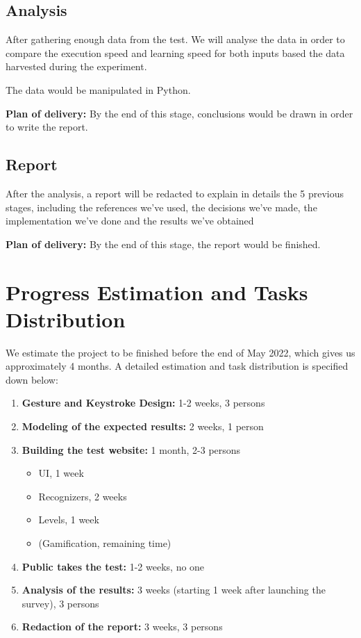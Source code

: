 \documentclass[12pt]{article}
\begin{document}
\subsection{Analysis}
After gathering enough data from the test. We will analyse the data in order to compare the execution speed and learning speed for both inputs based the data harvested during the experiment.

The data would be manipulated in Python.

\textbf{Plan of delivery: }By the end of this stage, conclusions would be drawn in order to write the report.

\subsection{Report}
After the analysis, a report will be redacted to explain in details the 5 previous stages, including the references we've used, the decisions we've made, the implementation we've done and the results we've obtained

\textbf{Plan of delivery: }By the end of this stage, the report would be finished.

\section{Progress Estimation and Tasks Distribution}
We estimate the project to be finished before the end of May 2022, which gives us approximately 4 months. A detailed estimation and task distribution is specified down below:

\begin{enumerate}
    \item \textbf{Gesture and Keystroke Design:} 1-2 weeks, 3 persons
    \item \textbf{Modeling of the expected results:} 2 weeks, 1 person
    \item \textbf{Building the test website:} 1 month, 2-3 persons
    \begin{itemize}
        \item UI, 1 week
        \item Recognizers, 2 weeks
        \item Levels, 1 week
        \item (Gamification, remaining time)
    \end{itemize}
    \item \textbf{Public takes the test:} 1-2 weeks, no one
    \item \textbf{Analysis of the results:} 3 weeks (starting 1 week after launching the survey), 3 persons 
    \item \textbf{Redaction of the report:} 3 weeks, 3 persons
\end{enumerate}
\end{document}
